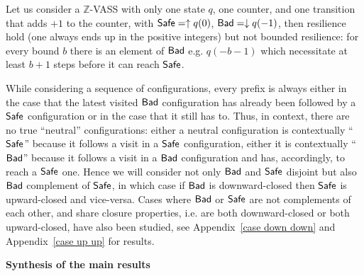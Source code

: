 \begin{example}
Let us consider a $\mathds{Z}$-VASS with only one state $q$, one counter, and one transition that adds $+1$ to the counter, with $\textsf{Safe} = \uparrow q(0)$, $\textsf{Bad} = \downarrow q(-1)$,
then resilience hold (one always ends up in the positive integers) but not bounded resilience: for every bound $b$ there is an element of $\textsf{Bad}$ e.g. $q(-b-1)$ which necessitate at least $b+1$ steps before it can reach $\textsf{Safe}$. 
\end{example}



While considering a sequence of configurations, every prefix is always 
either in the case that the latest visited $\textsf{Bad}$ configuration has already been followed by a $\textsf{Safe}$ configuration
or in the case that it still has to. 
Thus, in context, there are no true ``neutral'' configurations: either a neutral configuration is contextually ``$\textsf{Safe}$'' because it follows a visit in a $\textsf{Safe}$ configuration, either it is contextually ``$\textsf{Bad}$'' because it follows a visit in a $\textsf{Bad}$ configuration and has, accordingly, to reach a $\textsf{Safe}$ one.
Hence we will consider not only $\textsf{Bad}$ and $\textsf{Safe}$ disjoint but
	also
$\textsf{Bad}$ complement of $\textsf{Safe}$,
in which case
if $\textsf{Bad}$ is downward-closed then $\textsf{Safe}$ is upward-closed and vice-versa.
Cases where $\textsf{Bad}$ or $\textsf{Safe}$ are not complements of each other, and share closure properties, i.e. are both downward-closed or both upward-closed,
have also been studied, 
see 
Appendix~\ref{case down down}
and
Appendix~\ref{case up up} for results.








{\bf Synthesis of the main results}\label{synthesis}




